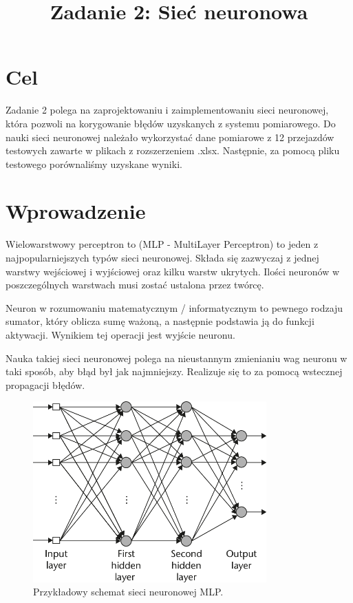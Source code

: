 \documentclass{classrep}
\author{
  \studentinfo{Radosław Grela}{216769} \and
  \studentinfo{Jakub Wąchała}{216914}
}
\title{Zadanie 2: Sieć neuronowa}
\begin{document}
\maketitle
\section{Cel}
Zadanie 2 polega na zaprojektowaniu i zaimplementowaniu sieci neuronowej, która pozwoli na korygowanie błędów uzyskanych z systemu pomiarowego. Do nauki sieci neuronowej należało wykorzystać dane pomiarowe z 12 przejazdów testowych zawarte w plikach z rozszerzeniem .xlsx. Następnie, za pomocą pliku testowego porównaliśmy uzyskane wyniki. \cite{zadanie}
\section{Wprowadzenie}
Wielowarstwowy perceptron to (MLP - MultiLayer Perceptron) to jeden z najpopularniejszych typów sieci neuronowej. Składa się zazwyczaj z jednej warstwy wejściowej i wyjściowej oraz kilku warstw ukrytych. Ilości neuronów w poszczególnych warstwach musi zostać ustalona przez twórcę. \cite{mlp}

Neuron w rozumowaniu matematycznym / informatycznym to pewnego rodzaju sumator, który oblicza sumę ważoną, a następnie podstawia ją do funkcji aktywacji. Wynikiem tej operacji jest wyjście neuronu. \cite{neuron}

Nauka takiej sieci neuronowej polega na nieustannym zmienianiu wag neuronu w taki sposób, aby błąd był jak najmniejszy. Realizuje się to za pomocą wstecznej propagacji błędów. 
\begin{figure}[h!]
	\centering
	\includegraphics[width=0.8\textwidth]{mlpr.png}
	\caption{Przykładowy schemat sieci neuronowej MLP. \cite{mlpr}}
\end{figure}
\newpage
\end{document}
